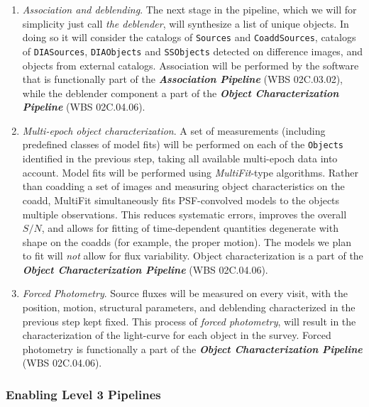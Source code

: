 \documentclass[12pt]{article}
\newcommand{\code}[1]{\texttt{#1}}
\newcommand{\DIASources}{\code{DIASources}\xspace}
\newcommand{\DIAObjects}{\code{DIAObjects}\xspace}
\newcommand{\Objects}{\code{Objects}\xspace}
\newcommand{\Sources}{\code{Sources}\xspace}
\newcommand{\CoaddSources}{\code{CoaddSources}\xspace}
\newcommand{\SSObjects}{\code{SSObjects}\xspace}
\newcommand{\wbsAssocP}{WBS 02C.03.02}
\newcommand{\wbsObjChar}{WBS 02C.04.06}
\begin{document}
\begin{enumerate}
    \item {\em Association and deblending}. The next stage in the pipeline, which we will for simplicity just call {\em the deblender}, will synthesize a list of unique objects. In doing so it will consider the catalogs of \Sources and \CoaddSources, catalogs of \DIASources, \DIAObjects and \SSObjects detected on difference images, and objects from external catalogs. Association will be performed by the software that is functionally part of the {\bf \em Association Pipeline} (\wbsAssocP), while the deblender component a part of the {\bf \em Object Characterization Pipeline} (\wbsObjChar).

    \item {\em Multi-epoch object characterization}. A set of measurements (including predefined classes of model fits) will be performed on each of the \Objects identified in the previous step, taking all available multi-epoch data into account. Model fits will be performed using {\em MultiFit}-type algorithms. Rather than coadding a set of images and measuring object characteristics on the coadd, MultiFit simultaneously fits PSF-convolved models to the objects multiple observations. This reduces systematic errors, improves the overall $S/N$, and allows for fitting of time-dependent quantities degenerate with shape on the coadds (for example, the proper motion). The models we plan to fit will {\em not} allow for flux variability. Object characterization is a part of the {\bf \em Object Characterization Pipeline} (\wbsObjChar).
    \item {\em Forced Photometry}. Source fluxes will be measured on every visit, with the position, motion, structural parameters, and deblending characterized in the previous step kept fixed.
      This process of {\em forced photometry}, will result in the characterization of the light-curve for each object in the survey. Forced photometry is functionally a part of the {\bf \em Object Characterization Pipeline} (\wbsObjChar).
\end{enumerate}



\subsubsection{Enabling Level 3 Pipelines}
\end{document}
